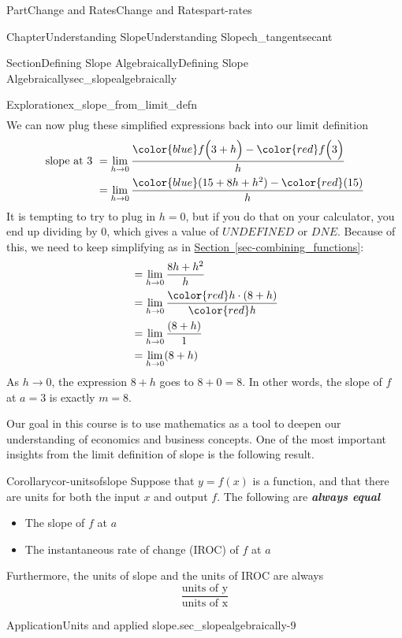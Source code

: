 \documentclass[oneside,10pt,]{tufte-book}
\newcommand{\xreffont}{\relax}
\newcommand{\alert}[1]{\textbf{\textit{#1}}}
\numberwithin{equation}{chapter}
\newcommand{\amp}{&}
\begin{document}
\begin{partptx}{Part}{Change and Rates}{}{Change and Rates}{}{}{part-rates}
\begin{chapterptx}{Chapter}{Understanding Slope}{}{Understanding Slope}{}{}{ch_tangentsecant}
\begin{sectionptx}{Section}{Defining Slope Algebraically}{}{Defining Slope Algebraically}{}{}{sec_slopealgebraically}
\begin{exploration}{Exploration}{}{ex_slope_from_limit_defn}
\begin{align*}
\end{align*}
We can now plug these simplified expressions back into our limit definition%
\begin{align*}
\text{slope at 3 } \amp = \lim_{h\rightarrow 0} \dfrac{ {\color{blue}f\Big(3+h\Big)} - {\color{red} f\Big(3\Big)}}{h}\\
\amp = \lim_{h\rightarrow 0} \dfrac{ {\color{blue} (15 + 8h + h^2)}  - {\color{red} (15) } }{h}
\end{align*}
It is tempting to try to plug in \(h=0\), but if you do that on your calculator, you end up dividing by 0, which gives a value of \(UNDEFINED\) or \(DNE\). Because of this, we need to keep simplifying as in \hyperref[sec-combining_functions]{Section~{\xreffont\ref{sec-combining_functions}}}:%
\begin{align*}
\amp = \lim_{h\rightarrow 0} \dfrac{ 8h + h^2 }{h}\\
\amp = \lim_{h\rightarrow 0} \dfrac{ {\color{red} h}\cdot (8 + h)  }{{\color{red} h}}\\
\amp = \lim_{h\rightarrow 0} \dfrac{ (8 + h) }{1}\\
\amp = \lim_{h\rightarrow 0} (8 + h) 
\end{align*}
As \(h\rightarrow 0 \), the expression  \(8+h\) goes to \(8+0=8\).  In other words, the slope of \(f\) at \(a=3\) is exactly \(m=8\).%
\end{exploration}%
Our goal in this course is to use mathematics as a tool to deepen our understanding of economics and business concepts. One of the most important insights from the limit definition of slope is the following result.%
\begin{corollary}{Corollary}{}{}{cor-unitsofslope}%
Suppose that \(y=f(x)\) is a function, and that there are units for both the input \(x\) and output \(f\).  The following are \alert{always equal}%
\begin{itemize}[label=\textbullet]
\item{}The slope of \(f\) at \(a\)%
\item{}The instantaneous rate of change (IROC) of \(f\) at \(a\)%
\end{itemize}
%
\par
Furthermore, the units of slope and the units of IROC are always%
\begin{equation*}
\dfrac{\text{units of y}}{\text{units of x}}
\end{equation*}
%
\end{corollary}
\begin{insight}{Application}{Units and applied slope.}{sec_slopealgebraically-9}%

\end{insight}
\end{sectionptx}
\end{chapterptx}
\end{partptx}
\end{document}

